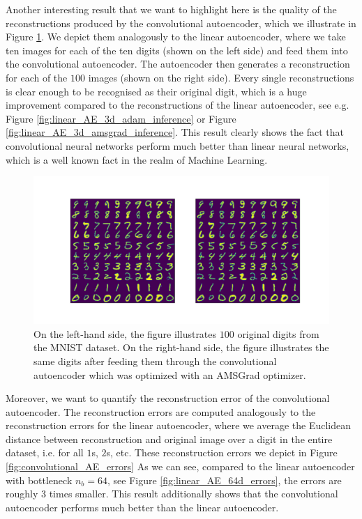 Another interesting result that we want to highlight here is the quality of the reconstructions produced by the convolutional autoencoder, which we illustrate in Figure \ref{fig:convolutional_AE_inference}. We depict them analogously to the linear autoencoder, where we take ten images for each of the ten digits (shown on the left side) and feed them into the convolutional autoencoder. The autoencoder then generates a reconstruction for each of the $100$ images (shown on the right side). Every single reconstructions is clear enough to be recognised as their original digit, which is a huge improvement compared to the reconstructions of the linear autoencoder, see e.g. Figure \ref{fig:linear_AE_3d_adam_inference} or Figure \ref{fig:linear_AE_3d_amsgrad_inference}. This result clearly shows the fact that convolutional neural networks perform much better than linear neural networks, which is a well known fact in the realm of Machine Learning.

\begin{figure}
\begin{center}
      \includegraphics[trim = 15mm 10mm 15mm 15mm, clip, width=\linewidth]{convolutional_AE_inference}
\end{center}
\caption{On the left-hand side, the figure illustrates $100$ original digits from the MNIST dataset. On the right-hand side, the figure illustrates the same digits after feeding them through the convolutional autoencoder which was optimized with an AMSGrad optimizer.}\label{fig:convolutional_AE_inference}
\end{figure}


Moreover, we want to quantify the reconstruction error of the convolutional autoencoder. The reconstruction errors are computed analogously to the reconstruction errors for the linear autoencoder, where we average the Euclidean distance between reconstruction and original image over a digit in the entire dataset, i.e. for all $1$s, $2$s, etc. These reconstruction errors we depict in Figure \ref{fig:convolutional_AE_errors} As we can see, compared to the linear autoencoder with bottleneck $n_b=64$, see Figure \ref{fig:linear_AE_64d_errors}, the errors are roughly $3$ times smaller. This result additionally shows that the convolutional autoencoder performs much better than the linear autoencoder.

